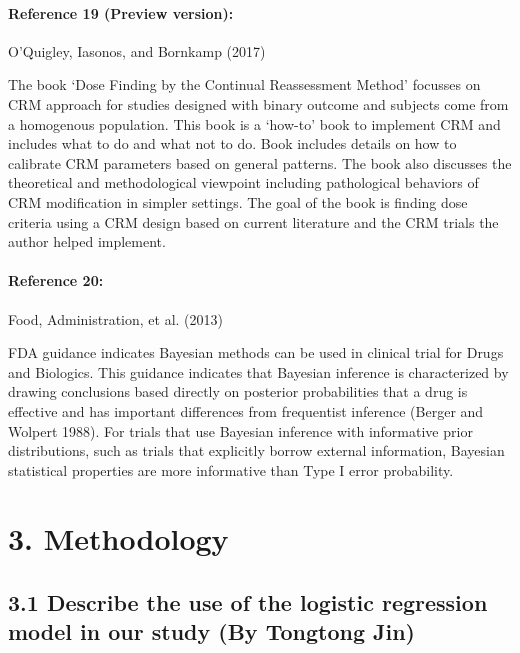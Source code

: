 \documentclass[
]{article}
\begin{document}
\hypertarget{reference-19-preview-version}{%
\paragraph{Reference 19 (Preview
version):}\label{reference-19-preview-version}}

O'Quigley, Iasonos, and Bornkamp (2017)

The book `Dose Finding by the Continual Reassessment Method' focusses on
CRM approach for studies designed with binary outcome and subjects come
from a homogenous population. This book is a `how-to' book to implement
CRM and includes what to do and what not to do. Book includes details on
how to calibrate CRM parameters based on general patterns. The book also
discusses the theoretical and methodological viewpoint including
pathological behaviors of CRM modification in simpler settings. The goal
of the book is finding dose criteria using a CRM design based on current
literature and the CRM trials the author helped implement.

\hypertarget{reference-20}{%
\paragraph{Reference 20:}\label{reference-20}}

Food, Administration, et al. (2013)

FDA guidance indicates Bayesian methods can be used in clinical trial
for Drugs and Biologics. This guidance indicates that Bayesian inference
is characterized by drawing conclusions based directly on posterior
probabilities that a drug is effective and has important differences
from frequentist inference (Berger and Wolpert 1988). For trials that
use Bayesian inference with informative prior distributions, such as
trials that explicitly borrow external information, Bayesian statistical
properties are more informative than Type I error probability.

\newpage

\hypertarget{methodology}{%
\section{3. Methodology}\label{methodology}}

\hypertarget{describe-the-use-of-the-logistic-regression-model-in-our-study-by-tongtong-jin}{%
\subsection{3.1 Describe the use of the logistic regression model in our
study (By Tongtong
Jin)}\label{describe-the-use-of-the-logistic-regression-model-in-our-study-by-tongtong-jin}}
\end{document}

